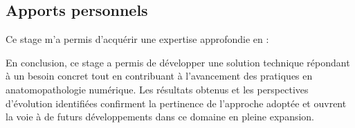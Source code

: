 \documentclass[12pt,a4paper]{report}
\begin{document}
\subsection{Apports personnels}

\begin{center}
Ce stage m'a permis d'acquérir une expertise approfondie en :
\end{center}

\vspace{0.5em}

En conclusion, ce stage a permis de développer une solution technique répondant à un besoin concret tout en contribuant à l'avancement des pratiques en anatomopathologie numérique. Les résultats obtenus et les perspectives d'évolution identifiées confirment la pertinence de l'approche adoptée et ouvrent la voie à de futurs développements dans ce domaine en pleine expansion.
\end{document}
